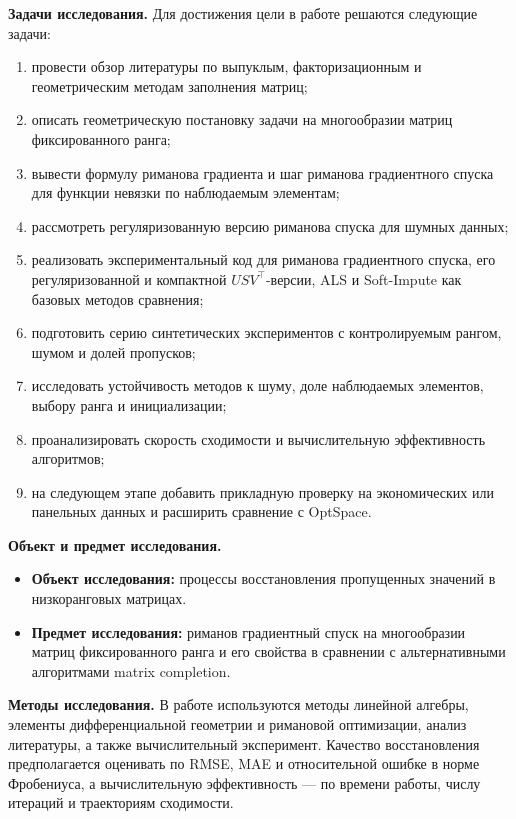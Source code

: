 \documentclass[a4paper,12pt]{article}
\begin{document}
\textbf{Задачи исследования.} Для достижения цели в работе решаются следующие задачи:
\begin{enumerate}[label=\arabic*.]
    \item провести обзор литературы по выпуклым, факторизационным и геометрическим методам заполнения матриц;
    \item описать геометрическую постановку задачи на многообразии матриц фиксированного ранга;
    \item вывести формулу риманова градиента и шаг риманова градиентного спуска для функции невязки по наблюдаемым элементам;
    \item рассмотреть регуляризованную версию риманова спуска для шумных данных;
    \item реализовать экспериментальный код для риманова градиентного спуска, его регуляризованной и компактной $USV^\top$-версии, ALS и Soft-Impute как базовых методов сравнения;
    \item подготовить серию синтетических экспериментов с контролируемым рангом, шумом и долей пропусков;
    \item исследовать устойчивость методов к шуму, доле наблюдаемых элементов, выбору ранга и инициализации;
    \item проанализировать скорость сходимости и вычислительную эффективность алгоритмов;
    \item на следующем этапе добавить прикладную проверку на экономических или панельных данных и расширить сравнение с OptSpace.
\end{enumerate}

\textbf{Объект и предмет исследования.}
\begin{itemize}
    \item \textbf{Объект исследования:} процессы восстановления пропущенных значений в низкоранговых матрицах.
    \item \textbf{Предмет исследования:} риманов градиентный спуск на многообразии матриц фиксированного ранга и его свойства в сравнении с альтернативными алгоритмами matrix completion.
\end{itemize}

\textbf{Методы исследования.} В работе используются методы линейной алгебры, элементы дифференциальной геометрии и римановой оптимизации, анализ литературы, а также вычислительный эксперимент. Качество восстановления предполагается оценивать по RMSE, MAE и относительной ошибке в норме Фробениуса, а вычислительную эффективность --- по времени работы, числу итераций и траекториям сходимости.
\end{document}
